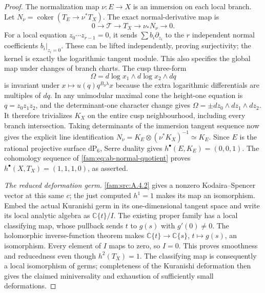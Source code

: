 \begin{proof}
The normalization map $\nu:E\to X$ is an immersion on each local
branch. Let $N_\nu=\operatorname{coker}(T_E\to\nu^*T_X)$.
The exact normal-derivative map is
\begin{equation}\label{fam:eq:ab-normal-quotient}
 0\longrightarrow\mathcal T\longrightarrow T_X
 \longrightarrow\nu_*N_\nu\longrightarrow0.
\end{equation}
For a local equation $z_0\cdots z_{r-1}=0$, it sends
$\sum b_i\partial_{z_i}$ to the $r$ independent normal coefficients
$b_i|_{z_i=0}$. These can be lifted independently, proving
surjectivity; the kernel is exactly the logarithmic tangent module.
This also specifies the global map under changes of branch charts.
The cusp three-form
\[
 \Omega=d\log x_1\wedge d\log x_2\wedge dq
\]
is invariant under $x\mapsto u(q)q^{B_0\lambda}x$ because the
extra logarithmic differentials are multiples of $dq$. In any
unimodular maximal cone the height-one equation is $q=z_0z_1z_2$,
and the determinant-one character change gives
$\Omega=\pm dz_0\wedge dz_1\wedge dz_2$.
It therefore trivializes $K_X$ on the entire cusp neighbourhood,
including every branch intersection. Taking determinants of the
immersion tangent sequence now gives the explicit line identification
$N_\nu=K_E\otimes(\nu^*K_X)^{-1}\simeq K_E$.
Since $E$ is the rational projective surface $\mathrm{dP}_6$,
Serre duality gives $h^\bullet(E,K_E)=(0,0,1)$.
The cohomology sequence of \eqref{fam:eq:ab-normal-quotient} proves
$h^\bullet(X,T_X)=(1,1,1,0)$, as asserted.

\emph{The reduced deformation germ.}
\ref{fam:src:A.4.2} gives a nonzero Kodaira--Spencer vector at this same $c$;
the just computed $h^1=1$ makes its map an isomorphism.
Embed the actual Kuranishi germ in its one-dimensional tangent space
and write its local analytic algebra as $\mathbb C\{t\}/I$.
The existing proper family has a local classifying map, whose pullback
sends $t$ to $g(s)$ with $g'(0)\ne0$. The holomorphic inverse-function
theorem makes $\mathbb C\{t\}\to\mathbb C\{s\}$, $t\mapsto g(s)$,
an isomorphism. Every element of $I$ maps to zero, so $I=0$.
This proves smoothness and reducedness even though $h^2(T_X)=1$.
The classifying map is consequently a local isomorphism of germs;
completeness of the Kuranishi deformation then gives the claimed
miniversality and exhaustion of sufficiently small deformations.
\end{proof}

